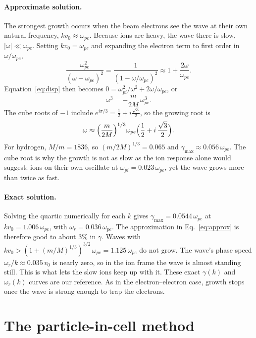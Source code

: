 \documentclass[10pt,twocolumn,letterpaper]{article}
\newcommand{\wpe}{\omega_{pe}}        %
\newcommand{\wpi}{\omega_{pi}}        %
\newcommand{\vz}{v_0}                 %
\begin{document}
\paragraph{Approximate solution.}
The strongest growth occurs when the beam electrons see the wave at their own natural
frequency, $k\vz\approx\wpe$. Because ions are heavy, the wave there is slow, $|\omega|\ll\wpe$.
Setting $k\vz=\wpe$ and expanding the electron term to first order in $\omega/\wpe$,
\begin{equation}
  \frac{\wpe^2}{(\omega-\wpe)^2} = \frac{1}{(1-\omega/\wpe)^2} \approx 1 + \frac{2\omega}{\wpe}.
\end{equation}
Equation~\eqref{eq:disp} then becomes $0 = \wpi^2/\omega^2 + 2\omega/\wpe$, or
\begin{equation}
  \omega^3 = -\frac{m}{2M}\,\wpe^3 .
\end{equation}
The cube roots of $-1$ include $e^{i\pi/3}=\tfrac12+i\tfrac{\sqrt3}{2}$, so the growing root is
\begin{equation}
  \omega \approx \Bigl(\frac{m}{2M}\Bigr)^{1/3}\wpe\Bigl(\frac12 + i\,\frac{\sqrt3}{2}\Bigr).
  \label{eq:approx}
\end{equation}
For hydrogen, $M/m=1836$, so $(m/2M)^{1/3}=0.065$ and $\gamma_{\max}\approx0.056\,\wpe$. The
cube root is why the growth is not as slow as the ion response alone would suggest: ions on
their own oscillate at $\wpi=0.023\,\wpe$, yet the wave grows more than twice as fast.

\paragraph{Exact solution.}
Solving the quartic numerically for each $k$ gives $\gamma_{\max}=0.0544\,\wpe$ at
$k\vz=1.006\,\wpe$, with $\omega_r=0.036\,\wpe$. The approximation in Eq.~\eqref{eq:approx} is
therefore good to about 3\% in $\gamma$. Waves with $k\vz>(1+(m/M)^{1/3})^{3/2}\,\wpe=1.125\,\wpe$
do not grow. The wave's phase speed $\omega_r/k\approx0.035\,\vz$ is nearly zero, so in the ion
frame the wave is almost standing still. This is what lets the slow ions keep up with it. These
exact $\gamma(k)$ and $\omega_r(k)$ curves are our reference. As in the electron--electron case,
growth stops once the wave is strong enough to trap the electrons.

\section{The particle-in-cell method}
\label{sec:pic}
\end{document}
